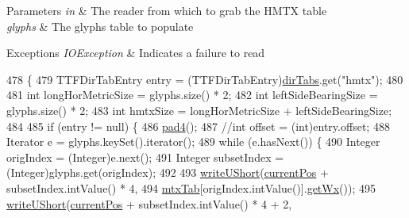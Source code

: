 \begin{DoxyParams}{Parameters}
{\em in} & The reader from which to grab the H\+M\+TX table \\
\hline
{\em glyphs} & The glyphs table to populate \\
\hline
\end{DoxyParams}

\begin{DoxyExceptions}{Exceptions}
{\em I\+O\+Exception} & Indicates a failure to read \\
\hline
\end{DoxyExceptions}

\begin{DoxyCode}
478                                                            \{
479         TTFDirTabEntry entry = (TTFDirTabEntry)\mbox{\hyperlink{classorg_1_1newdawn_1_1slick_1_1tools_1_1hiero_1_1truetype_1_1_t_t_f_file_ace74820d11ce19f9c04797c2715ac728}{dirTabs}}.get(\textcolor{stringliteral}{"hmtx"});
480 
481         \textcolor{keywordtype}{int} longHorMetricSize = glyphs.size() * 2;
482         \textcolor{keywordtype}{int} leftSideBearingSize = glyphs.size() * 2;
483         \textcolor{keywordtype}{int} hmtxSize = longHorMetricSize + leftSideBearingSize;
484 
485         \textcolor{keywordflow}{if} (entry != null) \{
486             \mbox{\hyperlink{classorg_1_1newdawn_1_1slick_1_1tools_1_1hiero_1_1truetype_1_1_t_t_f_sub_set_file_a0c2daa792c418ab2f19378ed0189e713}{pad4}}();
487             \textcolor{comment}{//int offset = (int)entry.offset;}
488             Iterator e = glyphs.keySet().iterator();
489             \textcolor{keywordflow}{while} (e.hasNext()) \{
490                 Integer origIndex = (Integer)e.next();
491                 Integer subsetIndex = (Integer)glyphs.get(origIndex);
492 
493                 \mbox{\hyperlink{classorg_1_1newdawn_1_1slick_1_1tools_1_1hiero_1_1truetype_1_1_t_t_f_sub_set_file_a9a4efc8b486dad23193ba0949bf1e533}{writeUShort}}(\mbox{\hyperlink{classorg_1_1newdawn_1_1slick_1_1tools_1_1hiero_1_1truetype_1_1_t_t_f_sub_set_file_a5027011db0d9c307afa8de09102eaa10}{currentPos}} + subsetIndex.intValue() * 4,
494                             \mbox{\hyperlink{classorg_1_1newdawn_1_1slick_1_1tools_1_1hiero_1_1truetype_1_1_t_t_f_file_ad78a13682e242fc4a0b5d34a8e5807fa}{mtxTab}}[origIndex.intValue()].\mbox{\hyperlink{classorg_1_1newdawn_1_1slick_1_1tools_1_1hiero_1_1truetype_1_1_t_t_f_mtx_entry_a4c40c027116d90af1d603f06f38d9919}{getWx}}());
495                 \mbox{\hyperlink{classorg_1_1newdawn_1_1slick_1_1tools_1_1hiero_1_1truetype_1_1_t_t_f_sub_set_file_a9a4efc8b486dad23193ba0949bf1e533}{writeUShort}}(\mbox{\hyperlink{classorg_1_1newdawn_1_1slick_1_1tools_1_1hiero_1_1truetype_1_1_t_t_f_sub_set_file_a5027011db0d9c307afa8de09102eaa10}{currentPos}} + subsetIndex.intValue() * 4 + 2,

\end{DoxyCode}
